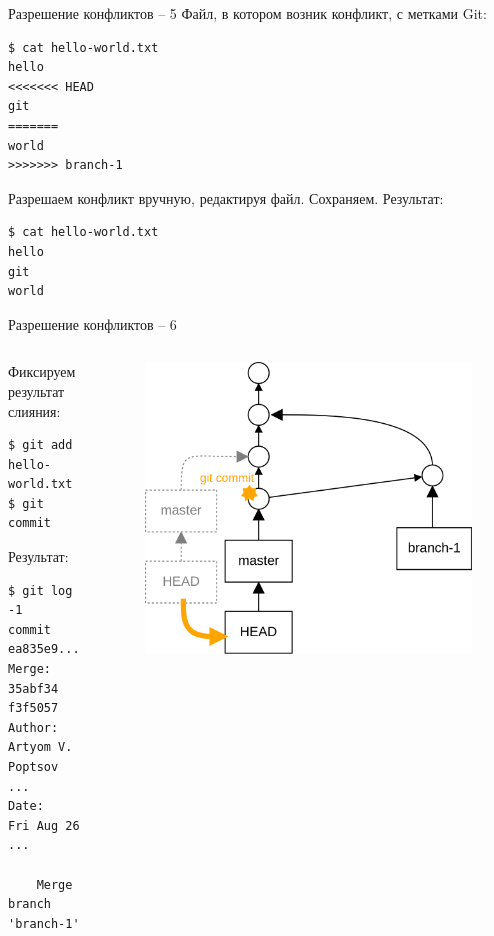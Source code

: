 \documentclass[presentation]{beamer}
\begin{document}
\begin{frame}[fragile]{Разрешение конфликтов -- 5}
  Файл, в котором возник конфликт, с метками Git:
\begin{verbatim}
$ cat hello-world.txt
hello
<<<<<<< HEAD
git
=======
world
>>>>>>> branch-1
\end{verbatim}
  Разрешаем конфликт вручную, редактируя файл.  Сохраняем.
  Результат:
\begin{verbatim}
$ cat hello-world.txt
hello
git
world
\end{verbatim}
\end{frame}

\begin{frame}[fragile]{Разрешение конфликтов -- 6}
  \begin{columns}
    \begin{column}{.5\textwidth}
      Фиксируем результат слияния:
\begin{verbatim}
$ git add hello-world.txt
$ git commit
\end{verbatim}
      
      Результат:
\begin{verbatim}
$ git log -1
commit ea835e9...
Merge: 35abf34 f3f5057
Author: Artyom V. Poptsov ...
Date:   Fri Aug 26 ...

    Merge branch 'branch-1'
\end{verbatim}
      \end{column}
      \begin{column}{.5\textwidth}
        \begin{figure}[htb]
          \centering
          \includegraphics[height=.6\textheight]{git-operation-merge-2-4}
        \end{figure}
      \end{column}
    \end{columns}
\end{frame}
\end{document}
